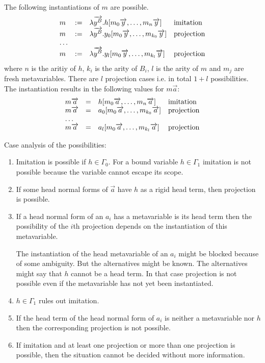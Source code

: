 The following instantiations of $m$ are possible.
$$
\begin{array}{lllll} 
    m &:=&
    \lambda {\overrightarrow {y^B}}. h [m_0 {\overrightarrow {y}}, \ldots, m_n {\overrightarrow {y}}]
    & \text{imitation}
    \\
    m &:=&
    \lambda {\overrightarrow {y^B}}. y_0 [m_0 {\overrightarrow {y}}, \ldots, m_{k_0} {\overrightarrow {y}}]
    & \text{projection}
    \\
    \ldots
    \\
    m &:=&
    \lambda {\overrightarrow {y^B}}. y_l [m_0 {\overrightarrow {y}}, \ldots, m_{k_l} {\overrightarrow {y}}]
    & \text{projection}
 \end{array}
$$
where $n$ is the aritiy of $h$, $k_i$ is the arity of $B_i$, $l$ is the arity
of $m$ and $m_j$ are fresh metavariables. There are $l$ projection cases i.e. in
total $1+l$ possibilities. The instantiation results in the following values for
$m \vec a$:
$$
\begin{array}{lllll} 
    m {\overrightarrow {a}} &=&
    h [m_0 {\overrightarrow {a}}, \ldots, m_n {\overrightarrow {a}}]
    & \text{imitation}
    \\
    m {\overrightarrow {a}} &=&
    a_0 [m_0 {\overrightarrow {a}}, \ldots, m_{k_0} {\overrightarrow {a}}]
    & \text{projection}
    \\
    \ldots
    \\
    m {\overrightarrow {a}} &=&
    a_l [m_0 {\overrightarrow {a}}, \ldots, m_{k_l} {\overrightarrow {a}}]
    & \text{projection}
 \end{array}
$$

Case analysis of the possibilities:
\begin{enumerate}

    \item Imitation is possible if $h \in \Gamma_0$. For a bound variable $h \in
        \Gamma_1$ imitation is not possible because the variable cannot escape
        its scope.

    \item If some head normal forms of $\vec a$ have $h$ as a rigid head term,
        then
        projection is possible.

    \item If a head normal form of an $a_i$ has a metavariable is its head term
        then the possibility of the $i$th projection depends on the
        instantiation of this metavariable.

        The instantiation of the head metavariable of an $a_i$ might be blocked
        because of some ambiguity. But the alternatives might be known. The
        alternatives might say that $h$ cannot be a head term. In that case
        projection is not possible even if the metavariable has not yet been
        instantiated.

    \item $h \in \Gamma_1$ rules out imitation.

    \item If the head term of the head normal form of $a_i$ is neither a
        metavariable nor $h$ then the corresponding projection is not possible.

    \item If imitation and at least one projection or more than one projection
        is possible, then the situation cannot be decided without more
        information.
\end{enumerate}


